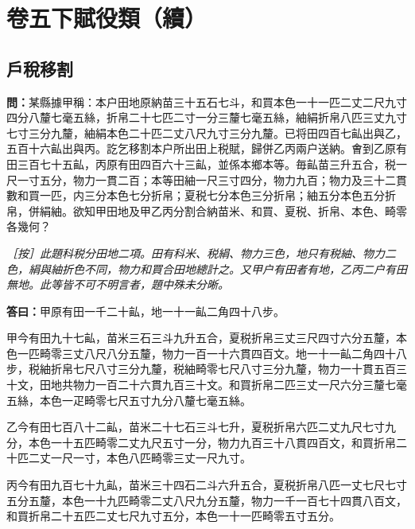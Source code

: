 \documentclass[11pt,a4paper]{article}
\newcommand{\Question}[1]{\par\noindent\textbf{\color{problemcolor}問：}#1\par}
\newcommand{\Answer}[1]{\par\noindent\textbf{\color{answercolor}答曰：}#1\par}
\newcommand{\EditorialNote}[1]{\par\noindent\textit{［按］#1}\par}
\begin{document}
\newpage
\section*{\color{titlecolor}卷五下\quad 賦役類（續）}

\subsection*{\color{sectioncolor}戶稅移割}

\Question{某縣據甲稱：本户田地原納苗三十五石七斗，和買本色一十一匹二丈二尺九寸四分八釐七毫五絲，折帛二十七匹二寸一分三釐七毫五絲，紬絹折帛八匹三丈九寸七寸三分九釐，紬絹本色二十匹二丈八尺九寸三分九釐。已将田四百七畆出與乙，五百十六畆出與丙。訖乞移割本户所出田上税賦，歸併乙丙兩户送納。㑹到乙原有田三百七十五畆，丙原有田四百六十三畆，並係本鄉本等。毎畆苗三升五合，税一尺一寸五分，物力一貫二百；本等田紬一尺三寸四分，物力九百；物力及三十二貫數和買一匹，内三分本色七分折帛；夏税七分本色三分折帛；紬五分本色五分折帛，併絹紬。欲知甲田地及甲乙丙分割合納苗米、和買、夏税、折帛、本色、畸零各幾何？}

\EditorialNote{此題科税分田地二項。田有科米、税絹、物力三色，地只有税紬、物力二色，絹與紬折色不同，物力和買合田地總計之。又甲户有田者有地，乙丙二户有田無地。此等皆不可不明言者，題中殊未分晰。}

\Answer{甲原有田一千二十畆，地一十一畆二角四十八步。

甲今有田九十七畆，苗米三石三斗九升五合，夏税折帛三丈三尺四寸六分五釐，本色一匹畸零三丈八尺八分五釐，物力一百一十六貫四百文。地一十一畆二角四十八步，税紬折帛七尺八寸三分九釐，税紬畸零七尺八寸三分九釐，物力一十貫五百三十文，田地共物力一百二十六貫九百三十文。和買折帛二匹三丈一尺六分三釐七毫五絲，本色一疋畸零七尺五寸九分八釐七毫五絲。

乙今有田七百八十二畆，苗米二十七石三斗七升，夏税折帛六匹二丈九尺七寸九分，本色一十五匹畸零二丈九尺五寸一分，物力九百三十八貫四百文，和買折帛二十匹二丈一尺一寸，本色八匹畸零三丈一尺九寸。

丙今有田九百七十九畆，苗米三十四石二斗六升五合，夏税折帛八匹一丈七尺七寸五分五釐，本色一十九匹畸零二丈八尺九分五釐，物力一千一百七十四貫八百文，和買折帛二十五匹二丈七尺九寸五分，本色一十一匹畸零五寸五分。}
\end{document}
